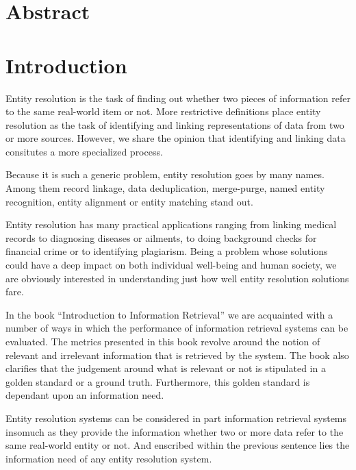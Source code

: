 \documentclass[11pt]{article}
\begin{document}
    \theoremstyle{definition}
    \newtheorem{defn}{Definition}[section]
    
    \section{Abstract}\label{sec:abstract}


    \section{Introduction}\label{sec:introduction}
    Entity resolution is the task of finding out whether two pieces of
    information refer to the same real-world item or not.
    More restrictive definitions place entity resolution as the task of
    identifying and linking representations of data from two or more
    sources\cite{Qia17}.
    However, we share the opinion that identifying and linking data consitutes a
    more specialized process\cite{Tal11}.

    Because it is such a generic problem, entity resolution goes by many names.
    Among them record linkage, data deduplication, merge-purge,
    named entity recognition, entity alignment or entity
    matching stand out.

    Entity resolution has many practical applications ranging from linking
    medical records to diagnosing diseases or ailments, to doing background
    checks for financial crime or to identifying plagiarism.
    Being a problem whose solutions could have a deep impact on both individual
    well-being and human society, we are obviously interested in understanding
    just how well entity resolution solutions fare.

    In the book ``Introduction to Information Retrieval'' we are acquainted with
    a number of ways in which the performance of information retrieval systems
    can be evaluated\cite{manning2008}.
    The metrics presented in this book revolve around the notion of relevant and
    irrelevant information that is retrieved by the system.
    The book also clarifies that the judgement around what is relevant or not is
    stipulated in a golden standard or a ground truth.
    Furthermore, this golden standard is dependant upon an information need.

    Entity resolution systems can be considered in part information retrieval
    systems insomuch as they provide the information whether two or more data
    refer to the same real-world entity or not.
    And enscribed within the previous sentence lies the information need of any
    entity resolution system.
\end{document}
